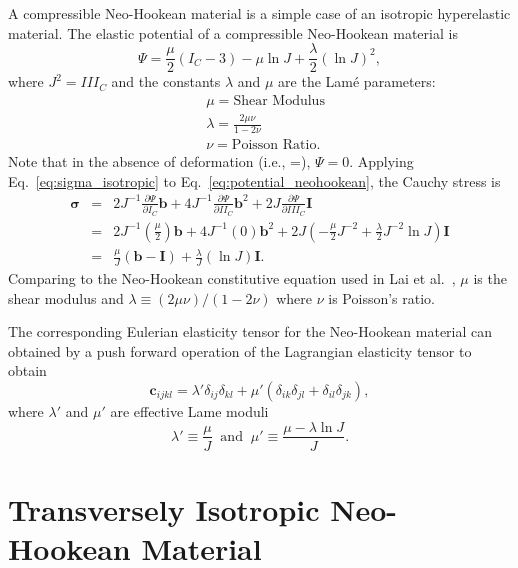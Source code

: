 \documentclass[12pt,aps,pre]{revtex4}
\begin{document}
A compressible Neo-Hookean material is a simple case of an isotropic hyperelastic material. The elastic potential of a compressible Neo-Hookean material is
%
\begin{equation}
\Psi = \frac{\mu}{2} (I_C-3) - \mu \ln J + \frac{\lambda}{2}(\ln J)^2,
\label{eq:potential_neohookean}
\end{equation}
%
where $J^2 = III_C$ and the constants $\lambda$ and $\mu$ are the Lam\'e parameters:
%
\begin{align}
&\mu = \text{Shear Modulus} \nonumber\\
&\lambda = \frac{2 \mu \nu}{1- 2 \nu} \nonumber\\
&\nu = \text{Poisson Ratio}.
\label{eq:lame_parameters}
\end{align}
%
Note that in the absence of deformation (i.e., =), $\Psi=0$. Applying Eq.\ \eqref{eq:sigma_isotropic} to Eq.\ \eqref{eq:potential_neohookean}, the Cauchy stress is
%
\begin{eqnarray}
\pmb{\sigma} &=&  2J^{-1}\frac{\partial \Psi}{\partial I_C} \pmb{b} + 4J^{-1} \frac{\partial \Psi}{\partial II_C} \pmb{b}^2 + 2J\frac{\partial \Psi}{\partial III_C} \pmb{I} \nonumber\\
%
&=& 2J^{-1} \left(\frac{\mu}{2}\right)\pmb{b} + 4J^{-1} (0) \pmb{b}^2 + 2J\left(-\frac{\mu}{2}J^{-2}+\frac{\lambda}{2} J^{-2} \ln J \right)\pmb{I}  \nonumber\\
%
&=& \frac{\mu}{J}(\pmb{b} - \pmb{I}) + \frac{\lambda}{J}(\ln J) \pmb{I}.
\label{eq:NeoHookean_stress}
\end{eqnarray}
%
Comparing to the Neo-Hookean constitutive equation used in Lai et al.\ \cite{Lai:2013fp}, $\mu$ is the shear modulus and $\lambda \equiv (2\mu \nu)/(1-2\nu)$ where $\nu$ is Poisson's ratio.

The corresponding Eulerian elasticity tensor for the Neo-Hookean material can obtained by a push forward operation of the Lagrangian elasticity tensor to obtain \cite{JavierBonet:2008uxa}
%
\begin{equation}
\pmb{c}_{ijkl} = \lambda'\delta_{ij}\delta_{kl} + \mu' (\delta_{ik}\delta_{jl} + \delta_{il}\delta_{jk}),
\end{equation}
%
where $\lambda'$ and $\mu'$ are effective Lame moduli
%
\begin{equation}
\lambda' \equiv \frac{\mu}{J} \ \text{ and } \ \mu' \equiv \frac{\mu-\lambda \ln J}{J}.
\end{equation}
%

\section{Transversely Isotropic Neo-Hookean Material}
\end{document}
